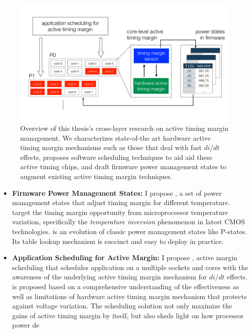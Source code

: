 \begin{figure}
  \centering
  \includegraphics[trim=0 0 0 0, clip, width=\columnwidth]{graphs/intro/sys-overview.pdf}
  \caption{Overview of this thesis's cross-layer research on active timing margin management. We characterizes state-of-the art hardware active timing margin mechanisms such as those that deal with fast $di/dt$ effects, proposes software scheduling techniques to aid aid these active timing chips, and draft firmware power management states to augment existing active timing margin techniques.}
  \label{fig:framework}
\end{figure}

\begin{itemize}
\item \textbf{Firmware Power Management States:} I propose \tistate, a set of power management states that adjust timing margin for different temperature. \tistates target the timing margin opportunity from microprocessor temperature variation, specifically the \textit{temperature inversion} phenomenon in latest CMOS technologies. \tistate is an evolution of classic power management states like P-states. Its table lookup mechanism is succinct and easy to deploy in practice.

\item \textbf{Application Scheduling for Active Margin:} I propose \ams, active margin scheduling that schedules application on a multiple sockets and cores with the awareness of the underlying active timing margin mechanism for $di/dt$ effects. \ams is proposed based on a comprehensive understanding of the effectiveness as well as limitations of hardware active timing margin mechanism that protects against voltage variation. The scheduling solution not only maximize the gains of active timing margin by itself, but also sheds light on how processor power de
\end{itemize}

